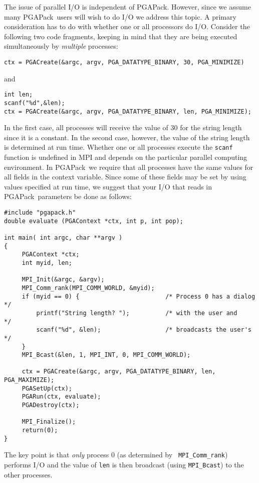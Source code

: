 \documentclass{report}
\newcommand{\pga}{PGAPack}
\begin{document}
The issue of parallel I/O is independent of \pga.  However, since we assume
many \pga\ users will wish to do I/O we address this topic.  A primary
consideration has to do with whether one or all processors do I/O.
Consider the following two code fragments, keeping in mind that they are being
executed simultaneously by {\em multiple} processes:
\begin{verbatim}
ctx = PGACreate(&argc, argv, PGA_DATATYPE_BINARY, 30, PGA_MINIMIZE) 
\end{verbatim}
and 
\begin{verbatim}
int len;
scanf("%d",&len);
ctx = PGACreate(&argc, argv, PGA_DATATYPE_BINARY, len, PGA_MINIMIZE);
\end{verbatim}
In the first case, all processes will receive the value of 30 for the string
length since it is a constant.  In the second case, however, the value of the
string length is determined at run time.  Whether 
one or all processes execute the {\tt scanf} function is undefined in MPI
and depends on the particular parallel computing environment.
In \pga\ we require that all processes have the same values for all
fields in the context variable.  Since some of these fields may be set by using
values specified at run time, we suggest that  your I/O that reads in \pga\
parameters be done as follows:
\begin{verbatim}
#include "pgapack.h"
double evaluate (PGAContext *ctx, int p, int pop);

int main( int argc, char **argv )
{
     PGAContext *ctx;
     int myid, len;

     MPI_Init(&argc, &argv);
     MPI_Comm_rank(MPI_COMM_WORLD, &myid);
     if (myid == 0) {                        /* Process 0 has a dialog */
         printf("String length? ");          /* with the user and      */
         scanf("%d", &len);                  /* broadcasts the user's  */
     }
     MPI_Bcast(&len, 1, MPI_INT, 0, MPI_COMM_WORLD);

     ctx = PGACreate(&argc, argv, PGA_DATATYPE_BINARY, len, PGA_MAXIMIZE);
     PGASetUp(ctx);
     PGARun(ctx, evaluate);
     PGADestroy(ctx);

     MPI_Finalize();
     return(0);
}
\end{verbatim}

The key point is that {\em only} process 0 (as determined by {\tt
MPI\_Comm\_rank}) performs I/O and the value of {\tt len} is then broadcast
(using {\tt MPI\_Bcast}) to the other processes.


\end{document}
